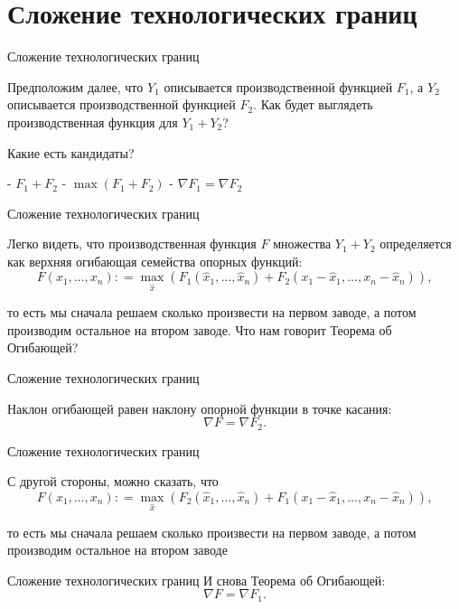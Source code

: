 \documentclass{beamer}
\begin{document}
\section{Сложение технологических границ}

\begin{frame}{Сложение технологических границ}

Предположим далее, что $Y_1$ описывается производственной функцией $F_1$, а $Y_2$ описывается производственной функцией $F_2$. Как будет выглядеть производственная функция для $Y_1 + Y_2$?

Какие есть кандидаты?

- $F_1 + F_2$
- $\max(F_1 + F_2)$
- $\nabla F_1 = \nabla F_2$

\end{frame}

\begin{frame}{Сложение технологических границ}

Легко видеть, что производственная функция $F$ множества $Y_1 + Y_2$ определяется как верхняя огибающая семейства опорных функций: $$F(x_1, \ldots, x_n) : = \max_{\hat x} \left(F_1(\hat x_1, \ldots, \hat x_n) + F_2(x_1 - \hat x_1, \ldots, x_n - \hat x_n)\right),$$

то есть мы сначала решаем сколько произвести на первом заводе, а потом производим остальное на втором заводе. Что нам говорит Теорема об Огибающей?

\end{frame}

\begin{frame}{Сложение технологических границ}

Наклон огибающей равен наклону опорной функции в точке касания:
$$ \nabla F = \nabla F_2.$$

\end{frame}

\begin{frame}{Сложение технологических границ}

С другой стороны, можно сказать, что
$$F(x_1, \ldots, x_n) : = \max_{\hat x} \left(F_2(\hat x_1, \ldots, \hat x_n) + F_1(x_1 - \hat x_1, \ldots, x_n - \hat x_n)\right),$$

то есть мы сначала решаем сколько произвести на первом заводе, а потом производим остальное на втором заводе

\end{frame}

\begin{frame}{Сложение технологических границ}
И снова Теорема об Огибающей:
$$ \nabla F = \nabla F_1.$$

\end{frame}
\end{document}
